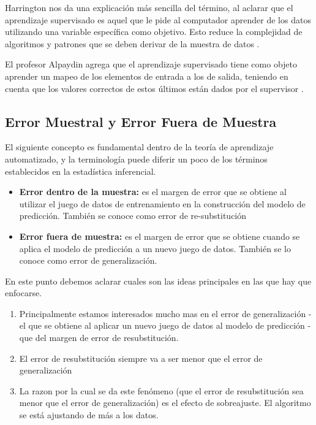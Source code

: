 Harrington nos da una explicación más sencilla del término, al aclarar que el aprendizaje supervisado es aquel que le pide al computador aprender de los datos utilizando una variable específica como objetivo. Esto reduce la complejidad de algoritmos y patrones que se deben derivar de la muestra de datos \cite{harrington}.

El profesor Alpaydin agrega que el aprendizaje supervisado tiene como objeto aprender un mapeo de los elementos de entrada a los de salida, teniendo en cuenta que los valores correctos de estos últimos están dados por el supervisor \cite{alpaydin}.

\subsection{Error Muestral y Error Fuera de Muestra}
El siguiente concepto es fundamental dentro de la teoría de aprendizaje automatizado, y la terminología puede diferir un poco de los términos establecidos en la estadística inferencial.

	\begin{itemize}
		\item \textbf{Error dentro de la muestra:} es el margen de error que se obtiene al utilizar el juego de datos de entrenamiento en la construcción del modelo de predicción. También se conoce como error de re-substitución
		\item  \textbf{Error fuera de muestra:} es el margen de error que se obtiene cuando se aplica el modelo de predicción a un nuevo juego de datos. También se lo conoce como error de generalización.
	\end{itemize}


En este punto debemos aclarar cuales son las ideas principales en las que hay que enfocarse.

\begin{enumerate}
	\item Principalmente estamos interesados mucho mas en el error de generalización - el que se obtiene al aplicar un nuevo juego de datos al modelo de predicción - que del margen de error de resubstitución.
	\item El error de resubstitución siempre va a ser menor que el error de generalización
	\item La razon por la cual se da este fenómeno (que el error de resubstitución sea menor que el error de generalización) es el efecto de sobreajuste. El algoritmo se está ajustando de más a los datos.
\end{enumerate}

